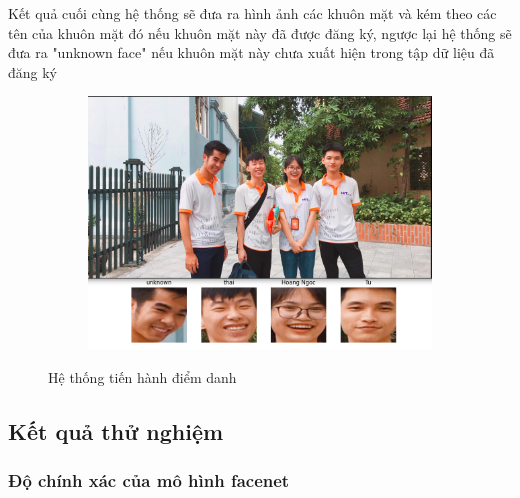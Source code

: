 \newpage
Kết quả cuối cùng hệ thống sẽ đưa ra hình ảnh các khuôn mặt và kém theo các tên của khuôn mặt đó
nếu khuôn mặt này đã được đăng ký, ngược lại hệ thống sẽ đưa ra "unknown face" nếu khuôn mặt này
chưa xuất hiện trong tập dữ liệu đã đăng ký

\begin{figure}
    \begin{subfigure}{1\textwidth}
        \includegraphics[width=1\linewidth]{Chapters/items/recog.png}
        \label{fig:recog}
    \end{subfigure}
    \caption{Hệ thống tiến hành điểm danh}
\end{figure}
\newpage
\subsection{Kết quả thử nghiệm}
\subsubsection{Độ chính xác của mô hình facenet}



